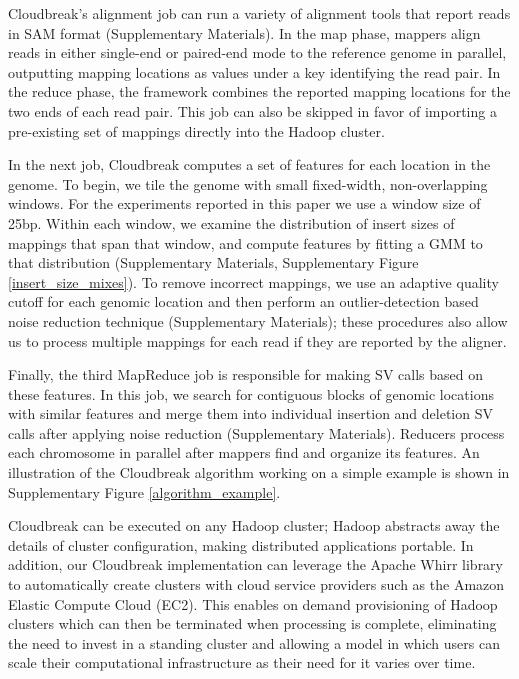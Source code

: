 \documentclass[11pt]{article}
\begin{document}
Cloudbreak's alignment job can run a variety of alignment tools that report reads in SAM format (Supplementary Materials). In the map phase, mappers align reads in either single-end or paired-end mode to the reference genome in parallel, outputting mapping locations as values under a key identifying the read pair. In the reduce phase, the framework combines the reported mapping locations for the two ends of each read pair. This job can also be skipped in favor of importing a pre-existing set of mappings directly into the Hadoop cluster.

In the next job, Cloudbreak computes a set of features for each location in the genome. To begin, we tile the genome with small fixed-width, non-overlapping windows. For the experiments reported in this paper we use a window size of 25bp. Within each window, we examine the distribution of insert sizes of mappings that span that window, and compute features by fitting a GMM to that distribution (Supplementary Materials, Supplementary Figure \ref{insert_size_mixes}). To remove incorrect mappings, we use an adaptive quality cutoff for each genomic location and then perform an outlier-detection based noise reduction technique (Supplementary Materials); these procedures also allow us to process multiple mappings for each read if they are reported by the aligner.

Finally, the third MapReduce job is responsible for making SV calls based on these features. In this job, we search for contiguous blocks of genomic locations with similar features and merge them into individual insertion and deletion SV calls after applying noise reduction (Supplementary Materials).  Reducers process each chromosome in parallel after mappers find and organize its features. An illustration of the Cloudbreak algorithm working on a simple example is shown in Supplementary Figure \ref{algorithm_example}.

Cloudbreak can be executed on any Hadoop cluster; Hadoop abstracts away the details of cluster configuration, making distributed applications portable. In addition, our Cloudbreak implementation can leverage the Apache Whirr library to automatically create clusters with cloud service providers such as the Amazon Elastic Compute Cloud (EC2). This enables on demand provisioning of Hadoop clusters which can then be terminated when processing is complete, eliminating the need to invest in a standing cluster and allowing a model in which users can scale their computational infrastructure as their need for it varies over time.
\end{document}
